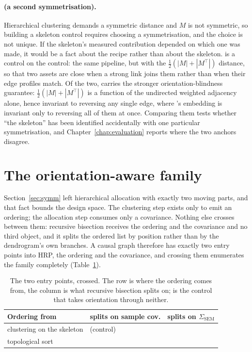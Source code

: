 \paragraph{\skelalt{} (a second symmetrisation).} Hierarchical clustering
demands
a symmetric distance and $M$ is not symmetric, so building a skeleton
control
requires choosing a symmetrisation, and the choice is not unique. If
the skeleton's measured contribution depended on which one was made, it
would be a fact about the
recipe rather than about the skeleton. \skelalt{} is a control on the
control: the
same pipeline, but with the $\tfrac{1}{2}(|M|+|M^\top|)$ distance, so that
two
assets are close when a strong link joins them rather than when their
edge profiles match. Of the two, \skelalt{} carries the stronger
orientation-blindness guarantee: $\tfrac{1}{2}(|M|+|M^\top|)$ is a
function of the undirected weighted adjacency alone, hence invariant to
reversing any single edge, where \skelsamp{}'s embedding is invariant
only to reversing all of them at once. Comparing them
tests whether ``the skeleton'' has been
identified accidentally with one particular symmetrisation, and
Chapter~\ref{chap:evaluation} reports where the two anchors disagree.

\section{The orientation-aware family}
\label{sec:d-family}

Section~\ref{sec:symm} left hierarchical allocation with exactly two moving
parts, and that fact bounds the design space. The clustering step exists only
to emit an ordering; the allocation step consumes only a
covariance. Nothing else crosses between them: recursive bisection
receives the ordering and the covariance and no third object, and it splits
the ordered list by position rather than by the dendrogram's own branches. A
causal graph therefore has exactly two entry points into HRP, the ordering
and the covariance, and crossing them
enumerates the family completely (Table~\ref{tab:crossing}).

\begin{table}[h]
  \centering
  \caption{The two entry points, crossed. The row is where the ordering
    comes from,
    the column is what recursive bisection splits on; \skelsamp{} is the
    control that takes orientation through neither.}
  \label{tab:crossing}
  \begin{tabular}{l l l}
    \toprule
    Ordering from & splits on sample cov. & splits on $\Sigma_{\mathrm{SEM}}$ \\
    \midrule
    clustering on the skeleton & \skelsamp{} (control) & \skelsem{} \\
    topological sort           & \orientsamp{}           & \orientsem{} \\
    \bottomrule
  \end{tabular}
\end{table}

